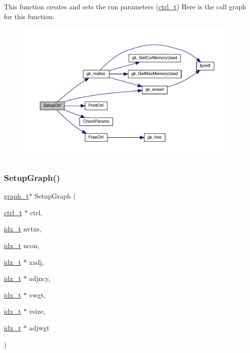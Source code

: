This function creates and sets the run parameters (\hyperlink{a00742}{ctrl\+\_\+t}) Here is the call graph for this function\+:\nopagebreak
\begin{figure}[H]
\begin{center}
\leavevmode
\includegraphics[width=350pt]{a00945_a1420c4ffbe28e4c3349678037adcb918_cgraph}
\end{center}
\end{figure}
\mbox{\label{a00945_a9192cba632de98d1759721a5676eaf05}} 
\subsubsection{\texorpdfstring{Setup\+Graph()}{SetupGraph()}}
{\footnotesize\ttfamily \hyperlink{a00734}{graph\+\_\+t}$\ast$ Setup\+Graph (\begin{DoxyParamCaption}\item[{\hyperlink{a00742}{ctrl\+\_\+t} $\ast$}]{ctrl,  }\item[{\hyperlink{a00876_aaa5262be3e700770163401acb0150f52}{idx\+\_\+t}}]{nvtxs,  }\item[{\hyperlink{a00876_aaa5262be3e700770163401acb0150f52}{idx\+\_\+t}}]{ncon,  }\item[{\hyperlink{a00876_aaa5262be3e700770163401acb0150f52}{idx\+\_\+t} $\ast$}]{xadj,  }\item[{\hyperlink{a00876_aaa5262be3e700770163401acb0150f52}{idx\+\_\+t} $\ast$}]{adjncy,  }\item[{\hyperlink{a00876_aaa5262be3e700770163401acb0150f52}{idx\+\_\+t} $\ast$}]{vwgt,  }\item[{\hyperlink{a00876_aaa5262be3e700770163401acb0150f52}{idx\+\_\+t} $\ast$}]{vsize,  }\item[{\hyperlink{a00876_aaa5262be3e700770163401acb0150f52}{idx\+\_\+t} $\ast$}]{adjwgt }\end{DoxyParamCaption})}

